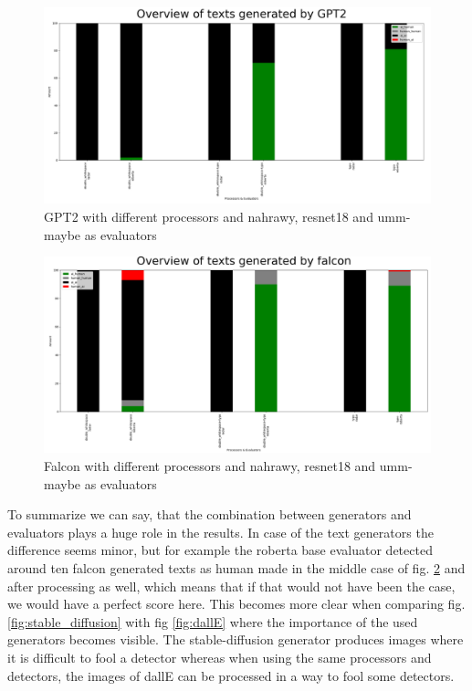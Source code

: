\documentclass{article} %
\begin{document}
\begin{figure}
	\centering
	\includegraphics[width=\linewidth]{images/gpt2.png}
	\caption{GPT2 with different processors and nahrawy, resnet18 and umm-maybe as evaluators}
	\label{fig:gpt2}
\end{figure}

\begin{figure}
	\centering
	\includegraphics[width=\linewidth]{images/falcon.png}
	\caption{Falcon with different processors and nahrawy, resnet18 and umm-maybe as evaluators}
	\label{fig:falcon}
\end{figure}


To summarize we can say, that the combination between generators and evaluators plays a huge role in the results. In case of the text generators the difference seems minor, but for example the roberta base evaluator detected around ten falcon generated texts as human made in the middle case of fig. \ref{fig:falcon} and after processing as well, which means that if that would not have been the case, we would have a perfect score here. 
This becomes more clear when comparing fig. \ref{fig:stable_diffusion} with fig \ref{fig:dallE} where the importance of the used generators becomes visible. The stable-diffusion generator produces images where it is difficult to fool a detector whereas when using the same processors and detectors, the images of dallE can be processed in a way to fool some detectors.
\end{document}
